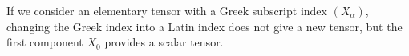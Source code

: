 If we consider an elementary tensor with a Greek subscript index $(X_\alpha)$, changing the Greek index into a Latin index does not give a new tensor, but the first component $X_0$ provides a scalar tensor.

































































































































































